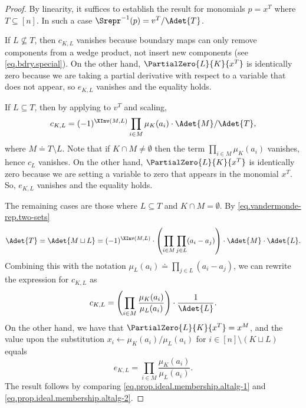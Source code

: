 \begin{proof}
    By linearity, it suffices to establish the result for monomials $p=x^T$ where $T \subseteq [n]$. In such a case $\Srepr^{-1}(p)=v^T/\Adet{T}$. 

    If $L \not\subseteq T$, then $c_{K,L}$ vanishes because boundary maps can only remove components from a wedge product, not insert new components (see \eqref{eq.bdry.special}). On the other hand,  $\PartialZero{L}{K}{x^T}$ is identically zero because we are taking a partial derivative with respect to a variable that does not appear, so $e_{K,L}$ vanishes and the equality holds. 
    
    If $L \subseteq T$, then by applying  to $v^T$ and scaling, 
    \[ c_{K,L} = (-1)^{\XInv(M,L)} \prod_{i\in M} \mu_{K}(a_i)\cdot \Adet{M} / \Adet{T}, \]
    where $M \doteq T \setminus L$. 
    Note that if $K\cap M \ne \emptyset$ then the term $\prod_{i\in M} \mu_{K}(a_i)$ vanishes, hence $c_L$ vanishes. On the other hand, $\PartialZero{L}{K}{x^T}$ is identically zero because we are setting a variable to zero that appears in the monomial $x^T$. So, $e_{K,L}$ vanishes and the equality holds. 
    
    The remaining cases are those where $L \subseteq T$ and $K\cap M = \emptyset$. By \eqref{eq.vandermonde-rep.two-sets} 
    \[ \Adet{T} = \Adet{M \sqcup L} = (-1)^{\XInv(M,L)} \cdot \left( \prod_{i\in M}\prod_{j\in L}(a_i-a_j) \right) \cdot \Adet{M}\cdot \Adet{L}. \]
    Combining this with the notation $\mu_L(a_i) \doteq  \prod_{j\in L}(a_i-a_j)$, we can rewrite the expression for $c_{K,L}$ as
    \begin{equation}\label{eq.prop.ideal.membership.altalg-1}
    c_{K,L} = \left( \prod_{i\in M} \frac{\mu_K(a_i)}{\mu_L(a_i)}\right) \cdot \frac{1}{\Adet{L}}.
    \end{equation}
    On the other hand, we have that $\PartialZero{L}{K}{x^T} = x^M$, and the value upon the substitution $x_i\gets \mu_K(a_i)/\mu_L(a_i)$ for $i \in [n]\setminus (K \sqcup L)$ equals
    \begin{equation}\label{eq.prop.ideal.membership.altalg-2} e_{K,L} = \prod_{i\in M} \frac{\mu_K(a_i)}{\mu_L(a_i)}. 
    \end{equation}
    The result follows by comparing \eqref{eq.prop.ideal.membership.altalg-1} and \eqref{eq.prop.ideal.membership.altalg-2}. 
\end{proof}

